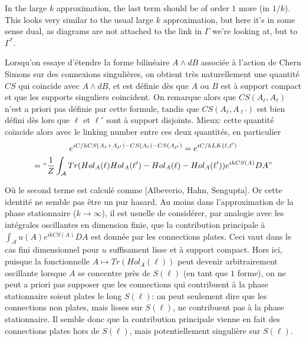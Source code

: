 \documentclass[10pt]{article}
\begin{document}
In the large $k$ approximation, the last term should be of order $1$ more (in $1/k$). This looks very similar to the usual large $k$ approximation, but here it’s in some sense dual, as diagrams are not attached to the link in $ \Gamma$ we’re looking at, but to $\Gamma^*$.

\newpage





















Lorsqu'on essaye d'étendre la forme bilinéaire $A\wedge dB$ associée à l'action de Chern Simons sur des connexions singulières, on obtient très naturellement une quantité $CS$ qui coincide avec $A\wedge dB$, et est définie dès que $A$ ou $B$ est à support compact et que les supports singuliers coincident. On remarque alors que $CS(A_\ell,A_\ell)$ n'est a priori pas définie par cette formule, tandis que $CS(A_\ell,A_{\ell'})$ est bien défini dès lors que $\ell$ et $\ell'$ sont à support disjoints. Mieux:  cette quantité coincide alors avec le linking number entre ces deux quantités, en particulier
\begin{multline}
   e^{i C/k CS(A_\ell+A_{\ell'})-CS(A_\ell)-CS(A_{\ell'})}=
   e^{i C/k LK(\ell,\ell')}\\
   =  ``\frac{1}{Z}\int_{\mathcal{A}} Tr(Hol_A(\ell)Hol_A(\ell')-Hol_A(\ell)-Hol_A(\ell')) e^{i k CS(A)} DA "
\end{multline}

Où le second terme est calculé comme [Albeverio, Hahn, Sengupta]. Or cette identité ne semble pas être un pur hasard. Au moins dans l'approximation de la phase stationnaire ($k\to \infty$), il est usuelle de considérer, par analogie avec les intégrales oscillantes en dimension finie,  que la contribution principale à $\int_{\mathcal{A}} u(A) e^{i k CS(A)} DA $ est donnée par les connections plates. Ceci vaut dans le cas fini dimensionnel pour $u$ suffisament lisse et à support compact. Hors ici, puisque la fonctionnelle $A\mapsto Tr(Hol_A(\ell))$ peut devenir arbitrairement oscillante lorsque $A$ se concentre près de $S(\ell)$ (en tant que $1$ forme), on ne peut a priori pas supposer que les connections qui contribuent à la phase stationnaire soient plates le long $S(\ell)$: on peut seulement dire que les connections non plates, mais lisses sur $S(\ell)$, ne contribuent pas à la phase stationnaire. Il semble donc que la contribution principale vienne en fait des connections plates hors de $S(\ell)$, mais potentiellement singulière sur $S(\ell)$.
\end{document}
